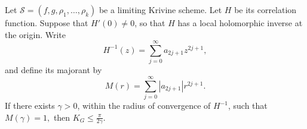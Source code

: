 \begin{corollary}
Let
\(
\mathcal{S}=(f,g,\rho_1,\ldots,\rho_k)
\)
be a limiting Krivine scheme. Let \(H\) be its correlation
function. Suppose that \(H'(0)\neq 0\), so that \(H\) has a local holomorphic inverse
at the origin. Write
\[
H^{-1}(z)
=
\sum_{j=0}^{\infty}a_{2j+1}z^{2j+1},
\]
and define its majorant by
\[
M(r)
=
\sum_{j=0}^{\infty}|a_{2j+1}|r^{2j+1}.
\]
If there exists \(\gamma>0\), within the radius of convergence of
\(H^{-1}\), such that
\(
M(\gamma)=1,
\)
then
\(
K_G
\leq
\frac{\pi}{2\gamma}.
\)
\end{corollary}




